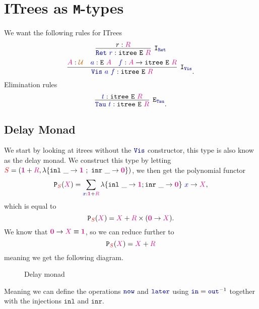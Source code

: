 \documentclass[twoside,11pt,openright]{report}
\newcommand*{\term}[1]{\textcolor{blue!80!black}{#1}}
\newcommand*{\type}[1]{\textcolor{magenta!90!black}{#1}}
\newcommand*{\container}[1]{\textcolor{red}{#1}}
\newcommand*{\universe}[1]{\textcolor{orange!80!black}{#1}}
\newcommand*{\unit}{\type{\textbf{1}}}
\newcommand*{\empt}{\type{\textbf{0}}}
\newcommand*{\function}[1]{\textcolor{blue!60!black}{\ensuremath{\mathtt{#1}}}}
\newcommand*{\typeformer}[1]{\ensuremath{\mathtt{#1}}}
\newcommand*{\functor}[1]{\ensuremath{\mathbf{\mathtt{#1}}}}
\begin{document}
\section{ITrees as \texttt{M}-types}
We want the following rules for ITrees
\begin{equation}
  \infer[\mathtt{I}_{\function{Ret}}]{\function{Ret}~\term{r} : \typeformer{itree}~\typeformer{E}~\type{R}}{r : \type{R}}
\end{equation}
\begin{equation}
  \infer[\mathtt{I}_{\function{Vis}}]{\function{Vis}~\term{a}~\term{f} : \typeformer{itree}~\typeformer{E}~\type{R}}{\type{A} : \universe{\mathcal{U}} & \term{a} : \typeformer{E}~\type{A} & \term{f} : \type{A} \rightarrow \typeformer{itree}~\typeformer{E}~\type{R}}.
\end{equation}
Elimination rules
\begin{equation}
  \infer[\mathtt{E}_{\function{Tau}}]{\function{Tau}~\term{t} : \typeformer{itree}~\typeformer{E}~\type{R}}{\term{t} : \typeformer{itree}~\typeformer{E}~\type{R}}.
\end{equation}

\subsection{Delay Monad}
We start by looking at itrees without the \(\function{Vis}\) constructor, this type is also know as the delay monad. We construct this type by letting \(\container{S} = (\unit + \type{R},\lambda \{ \texttt{inl}~\_ \rightarrow \unit~;~\texttt{inr}~\_ \rightarrow \empt \})\), we then get the polynomial functor
\begin{equation}
  \functor{P}_{\container{S}}(\type{X}) = \sum_{\term{x} : \unit + \type{R}} \lambda \{ \texttt{inl}~\_ \rightarrow \unit ; \texttt{inr}~\_ \rightarrow \empt\}~\term{x} \rightarrow \type{X},
\end{equation}
which is equal to
\begin{equation}
  \functor{P}_{\container{S}}(\type{X}) = \type{X} + \type{R} \times (\empt \rightarrow \type{X}).
\end{equation}
We know that \(\empt \rightarrow \type{X} \equiv \unit\), so we can reduce further to
\begin{equation}
  \functor{P}_{\container{S}}(\type{X}) = \type{X} + \type{R}
\end{equation}
meaning we get the following diagram.

\begin{figure}[h]
  \centering
  \caption{Delay monad}
\end{figure}
\noindent Meaning we can define the operations \(\function{now}\) and \(\function{later}\) using \(\function{in} = \function{out}^{-1}\) together with the injections \(\mathtt{inl}\) and \(\mathtt{inr}\). 
\end{document}
